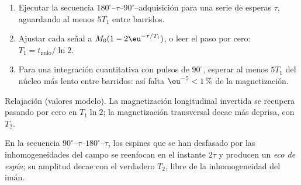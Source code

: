 \begin{method}\label{met:b3:advanced-nmr:t1}
\begin{enumerate}
  \item Ejecutar la secuencia $180^\circ$--$\tau$--$90^\circ$--adquisición para una serie de esperas
        $\tau$, aguardando al menos $5T_1$ entre barridos.
  \item Ajustar cada señal a $M_0(1 - 2\eu^{-\tau/T_1})$, o leer el paso por cero: $T_1 =
        t_{\mathrm{nulo}}/\ln2$.
  \item Para una integración cuantitativa con pulsos de $90^\circ$, esperar al menos $5T_1$ del
        núcleo más lento entre barridos: así falta $\eu^{-5} < 1\,\%$ de la
        magnetización.
\end{enumerate}
\end{method}

\begin{omfigure}

{\small Relajación (valores modelo). La magnetización longitudinal invertida
se recupera pasando por cero en $T_1\ln2$; la magnetización transversal decae
más deprisa, con $T_2$.}
\end{omfigure}

\begin{definition}\label{def:b3:advanced-nmr:echo}
En la secuencia $90^\circ$--$\tau$--$180^\circ$--$\tau$, los espines que se han desfasado
por las inhomogeneidades del campo se reenfocan en el instante $2\tau$ y producen un
\emph{eco de espín}; su amplitud decae con el verdadero $T_2$, libre de
la inhomogeneidad del imán.
\end{definition}

